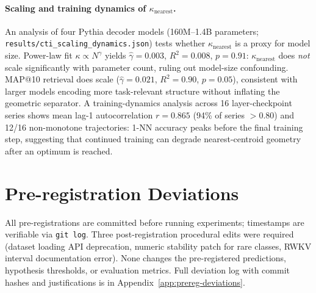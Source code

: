 \documentclass{article}
\begin{document}
\paragraph{Scaling and training dynamics of $\kappa_{\mathrm{nearest}}$.}
An analysis of four Pythia decoder models (160M--1.4B parameters; \texttt{results/cti\_scaling\_dynamics.json}) tests whether $\kappa_{\mathrm{nearest}}$ is a proxy for model size.
Power-law fit $\kappa\propto N^\gamma$ yields $\hat\gamma=0.003$, $R^2=0.008$, $p=0.91$: $\kappa_{\mathrm{nearest}}$ does \emph{not} scale significantly with parameter count, ruling out model-size confounding.
MAP@10 retrieval does scale ($\hat\gamma=0.021$, $R^2=0.90$, $p=0.05$), consistent with larger models encoding more task-relevant structure without inflating the geometric separator.
A training-dynamics analysis across 16 layer-checkpoint series shows mean lag-1 autocorrelation $r=0.865$ (94\% of series $>0.80$) and 12/16 non-monotone trajectories: 1-NN accuracy peaks before the final training step, suggesting that continued training can degrade nearest-centroid geometry after an optimum is reached.

\section{Pre-registration Deviations}
\label{sec:prereg-deviations}
All pre-registrations are committed before running experiments; timestamps are verifiable via \texttt{git log}. Three post-registration procedural edits were required (dataset loading API deprecation, numeric stability patch for rare classes, RWKV interval documentation error). None changes the pre-registered predictions, hypothesis thresholds, or evaluation metrics. Full deviation log with commit hashes and justifications is in Appendix~\ref{app:prereg-deviations}.
\end{document}
